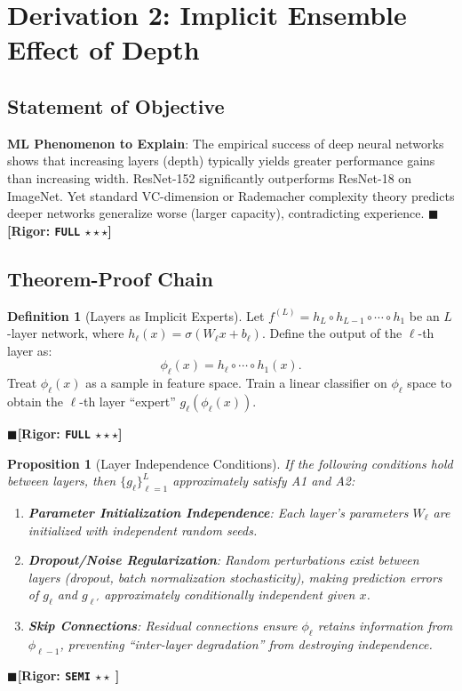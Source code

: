 \documentclass[12pt,a4paper]{article}
\newtheorem{proposition}[theorem]{Proposition}
\theoremstyle{definition}
\newtheorem{definition}{Definition}[section]
\theoremstyle{remark}
\newcommand{\rigorFull}{$\blacksquare$\;\textbf{[Rigor: \texttt{FULL} $\star\star\star$]}}
\newcommand{\rigorSemi}{$\blacksquare$\;\textbf{[Rigor: \texttt{SEMI} $\star\star\;$]}}
\begin{document}
\section{Derivation 2: Implicit Ensemble Effect of Depth}
\label{sec:depth}

\subsection{Statement of Objective}
\textbf{ML Phenomenon to Explain}: The empirical success of deep neural networks shows that increasing layers (depth) typically yields greater performance gains than increasing width. ResNet-152 significantly outperforms ResNet-18 on ImageNet. Yet standard VC-dimension or Rademacher complexity theory predicts deeper networks generalize worse (larger capacity), contradicting experience.
\rigorFull

\subsection{Theorem-Proof Chain}

\begin{definition}[Layers as Implicit Experts]
Let $f^{(L)} = h_L \circ h_{L-1} \circ \cdots \circ h_1$ be an $L$-layer network, where $h_\ell(x) = \sigma(W_\ell x + b_\ell)$. Define the output of the $\ell$-th layer as:
\begin{equation}
\phi_\ell(x) = h_\ell \circ \cdots \circ h_1(x).
\end{equation}
Treat $\phi_\ell(x)$ as a sample in feature space. Train a linear classifier on $\phi_\ell$ space to obtain the $\ell$-th layer ``expert'' $g_\ell(\phi_\ell(x))$.
\end{definition}
\rigorFull

\begin{proposition}[Layer Independence Conditions]
\label{prop:4}
If the following conditions hold between layers, then $\{g_\ell\}_{\ell=1}^L$ approximately satisfy A1 and A2:
\begin{enumerate}[label=\arabic*.]
\item \textbf{Parameter Initialization Independence}: Each layer's parameters $W_\ell$ are initialized with independent random seeds.
\item \textbf{Dropout/Noise Regularization}: Random perturbations exist between layers (dropout, batch normalization stochasticity), making prediction errors of $g_\ell$ and $g_{\ell'}$ approximately conditionally independent given $x$.
\item \textbf{Skip Connections}: Residual connections ensure $\phi_\ell$ retains information from $\phi_{\ell-1}$, preventing ``inter-layer degradation'' from destroying independence.
\end{enumerate}
\end{proposition}
\rigorSemi
\end{document}
